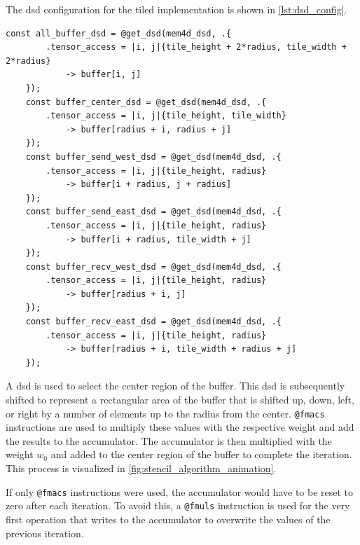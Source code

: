 The \ac{dsd} configuration for the tiled implementation is shown in \autoref{lst:dsd_config}.

\begin{lstlisting}[language=CSL, caption={\ac{dsd} configuration for the tiled implementation}, label={lst:dsd_config}]
    const all_buffer_dsd = @get_dsd(mem4d_dsd, .{ 
        .tensor_access = |i, j|{tile_height + 2*radius, tile_width + 2*radius} 
            -> buffer[i, j] 
    });
    const buffer_center_dsd = @get_dsd(mem4d_dsd, .{ 
        .tensor_access = |i, j|{tile_height, tile_width} 
            -> buffer[radius + i, radius + j] 
    });
    const buffer_send_west_dsd = @get_dsd(mem4d_dsd, .{ 
        .tensor_access = |i, j|{tile_height, radius} 
            -> buffer[i + radius, j + radius] 
    });
    const buffer_send_east_dsd = @get_dsd(mem4d_dsd, .{ 
        .tensor_access = |i, j|{tile_height, radius} 
            -> buffer[i + radius, tile_width + j] 
    });
    const buffer_recv_west_dsd = @get_dsd(mem4d_dsd, .{ 
        .tensor_access = |i, j|{tile_height, radius} 
            -> buffer[radius + i, j] 
    });
    const buffer_recv_east_dsd = @get_dsd(mem4d_dsd, .{ 
        .tensor_access = |i, j|{tile_height, radius} 
            -> buffer[radius + i, tile_width + radius + j] 
    });    
\end{lstlisting}


A \ac{dsd} is used to select the center region of the buffer. This \ac{dsd} is subsequently shifted to represent a rectangular area of the buffer that is shifted up, down, left, or right by a number of elements up to the radius from the center. \texttt{@fmacs} instructions are used to multiply these values with the respective weight and add the results to the accumulator. The accumulator is then multiplied with the weight $w_0$ and added to the center region of the buffer to complete the iteration. This process is visualized in \autoref{fig:stencil_algorithm_animation}.

If only \texttt{@fmacs} instructions were used, the accumulator would have to be reset to zero after each iteration. To avoid this, a \texttt{@fmuls} instruction is used for the very first operation that writes to the accumulator to overwrite the values of the previous iteration.



